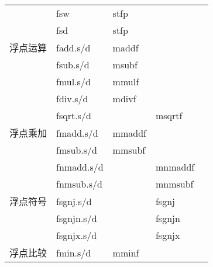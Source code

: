 \begin{longtable}{lllll}
                               & fsw                              & stfp                         &                                \\
                               & fsd                              & stfp                         &                                \\
                               \hline
    浮点运算                       & fadd.s/d                         & maddf                        &                                \\
                               & fsub.s/d                         & msubf                        &                                \\
                               & fmul.s/d                         & mmulf                        &                                \\
                               & fdiv.s/d                         & mdivf                        &                                \\
                               & fsqrt.s/d                        &                              & msqrtf                         \\
                               \hline
    浮点乘加                       & fmadd.s/d                        & mmaddf                       &                                \\
                               & fmsub.s/d                        & mmsubf                       &                                \\
                               & fnmadd.s/d                       &                              & mnmaddf                        \\
                               & fnmsub.s/d                       &                              & mnmsubf                        \\
                               \hline
    浮点符号                       & fsgnj.s/d                        &                              & fsgnj                          \\
                               & fsgnjn.s/d                       &                              & fsgnjn                         \\
                               & fsgnjx.s/d                       &                              & fsgnjx                         \\
                               \hline
    浮点比较                       & fmin.s/d                         & mminf                        &                                \\

\end{longtable}
